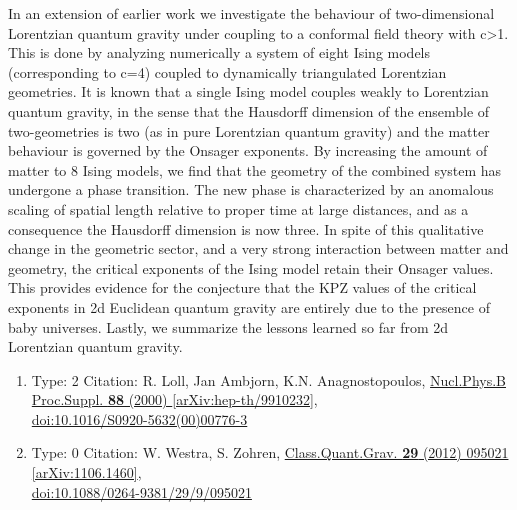 \documentclass[a4paper,10pt]{article}
\begin{document}
\begin{enumerate}
In an extension of earlier work we investigate the behaviour of two-dimensional Lorentzian quantum gravity under coupling to a conformal field theory with c>1. This is done by analyzing numerically a system of eight Ising models (corresponding to c=4) coupled to dynamically triangulated Lorentzian geometries. It is known that a single Ising model couples weakly to Lorentzian quantum gravity, in the sense that the Hausdorff dimension of the ensemble of two-geometries is two (as in pure Lorentzian quantum gravity) and the matter behaviour is governed by the Onsager exponents. By increasing the amount of matter to 8 Ising models, we find that the geometry of the combined system has undergone a phase transition. The new phase is characterized by an anomalous scaling of spatial length relative to proper time at large distances, and as a consequence the Hausdorff dimension is now three. In spite of this qualitative change in the geometric sector, and a very strong interaction between matter and geometry, the critical exponents of the Ising model retain their Onsager values. This provides evidence for the conjecture that the KPZ values of the critical exponents in 2d Euclidean quantum gravity are entirely due to the presence of baby universes. Lastly, we summarize the lessons learned so far from 2d Lorentzian quantum gravity.
\begin{enumerate}
  \item Type: 2 Citation: R. Loll, Jan Ambjorn, K.N. Anagnostopoulos, \href{https://www.doi.org/10.1016/S0920-5632(00)00776-3}{Nucl.Phys.B Proc.Suppl. {\bf 88} (2000) }  \href{https://arxiv.org/abs/hep-th/9910232}{[arXiv:hep-th/9910232]},\\\href{https://www.doi.org/10.1016/S0920-5632(00)00776-3}{doi:10.1016/S0920-5632(00)00776-3}
  \item Type: 0 Citation: W. Westra, S. Zohren, \href{https://www.doi.org/10.1088/0264-9381/29/9/095021}{Class.Quant.Grav. {\bf 29} (2012) 095021}  \href{https://arxiv.org/abs/1106.1460}{[arXiv:1106.1460]},\\\href{https://www.doi.org/10.1088/0264-9381/29/9/095021}{doi:10.1088/0264-9381/29/9/095021}

\end{enumerate}
\end{enumerate}
\end{document}
